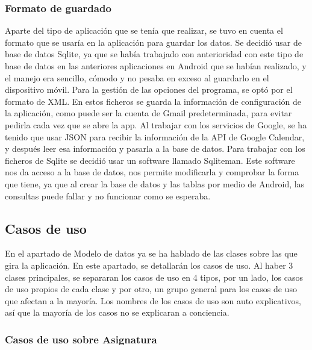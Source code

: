 \subsubsection{Formato de guardado}
\label{subsubsecc:formato de guardado}

Aparte del tipo de aplicación que se tenía que realizar, se tuvo en cuenta el formato que se usaría en la aplicación para guardar los datos.
Se decidió usar de base de datos Sqlite, ya que se había trabajado con anterioridad con este tipo de base de datos en las anteriores aplicaciones en Android que se habían realizado, y el manejo era sencillo, cómodo y no pesaba en exceso al guardarlo en el dispositivo móvil.
Para la gestión de las opciones del programa, se optó por el formato de XML. En estos ficheros se guarda la información de configuración de la aplicación, como puede ser la cuenta de Gmail predeterminada, para evitar pedirla cada vez que se abre la app.
Al trabajar con los servicios de Google, se ha tenido que usar JSON para recibir la información de la API de Google Calendar, y después leer esa información y pasarla a la base de datos.
Para trabajar con los ficheros de Sqlite se decidió usar un software llamado Sqliteman.
Este software nos da acceso a la base de datos, nos permite modificarla y comprobar la forma que tiene, ya que al crear la base de datos y las tablas por medio de Android, las consultas puede fallar y no funcionar como se esperaba.

\subsection{Casos de uso}
\label{subsecc:casos de uso}

En el apartado de Modelo de datos ya se ha hablado de las clases sobre las que gira la aplicación.
En este apartado, se detallarán los casos de uso. Al haber 3 clases principales, se separaran los casos de uso en 4  tipos, por un lado, los casos de uso propios de cada clase y por otro, un grupo general para los casos de uso que afectan a la mayoría.
Los nombres de los casos de uso son auto explicativos, así que la mayoría de los casos no se explicaran a conciencia.

\subsubsection{Casos de uso sobre Asignatura}
\label{subsubsecc:Casos de uso sobre Asignatura}

